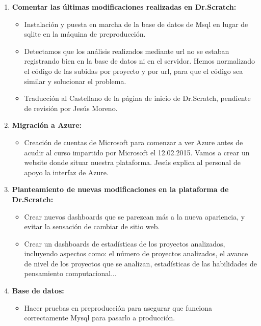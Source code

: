 \documentclass[a4paper,12pt]{letter}
\begin{document}
\begin{letter}
\begin{enumerate}
    
    \item {\textbf {Comentar las últimas modificaciones realizadas en Dr.Scratch:}}
    \begin{itemize}
        \item {Instalación y puesta en marcha de la base de datos de Msql en
                lugar de sqlite en la máquina de preproducción.}
        \item {Detectamos que los análisis realizados mediante url no se estaban
                registrando bien en la base de datos ni en el servidor. 
                Hemos normalizado el código de las subidas por proyecto y por 
                url, para que el código sea similar y solucionar el problema.}
        \item {Traducción al Castellano de la página de inicio de Dr.Scratch, 
                pendiente de revisión por Jesús Moreno.}
    \end{itemize}

    \item{\textbf {Migración a Azure:}}
    \begin{itemize}
        \item {Creación de cuentas de Microsoft para comenzar a ver Azure antes
                de acudir al curso impartido por Microsoft el 12.02.2015. Vamos
                a crear un website donde situar nuestra plataforma. Jesús
                explica al personal de apoyo la interfaz de Azure.}

    \end{itemize}

	\item{\textbf {Planteamiento de nuevas modificaciones en la plataforma de 
                    Dr.Scratch:}}
    \begin{itemize}
        \item {Crear nuevos dashboards que se parezcan más a la nueva apariencia,
                y evitar la sensación de cambiar de sitio web.}
        \item {Crear un dashboards de estadísticas de los proyectos analizados,
               incluyendo aspectos como: el número de proyectos analizados,
                el avance de nivel de los proyectos que se analizan, estadísticas
                de las habilidades de pensamiento computacional...}
    \end{itemize}

    \item {\textbf {Base de datos:}}
        \begin{itemize}
            \item {Hacer pruebas en preproducción para asegurar que funciona
                    correctamente Mysql para pasarlo a producción.}
        \end{itemize}
\end{enumerate}

\end{letter}
\end{document}
